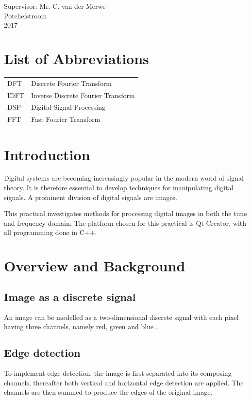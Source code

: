 \documentclass[a4paper,12pt]{article}
\numberwithin{equation}{section} %
\numberwithin{figure}{section}
\begin{document}
\thispagestyle{empty} 	%
Supervisor: Mr. C. van der Merwe\\
Potchefstroom\\
2017

\pagebreak

\tableofcontents 

\listoffigures

\section*{List of Abbreviations}
\begin{center}
\begin{tabular}{l l}
DFT & Discrete Fourier Transform\\
IDFT & Inverse Discrete Fourier Transform\\
DSP & Digital Signal Processing\\
FFT & Fast Fourier Transform\\
\end{tabular}
\end{center}

\newpage
{}

\section{Introduction}
Digital systems are becoming increasingly popular in the modern world of signal theory. It is therefore essential to develop techniques for manipulating digital signals. A prominent division of digital signals are images. 

This practical investigates methods for processing digital images in both the time and frequency domain. The platform chosen for this practical is Qt Creator, with all programming done in C++.

\section{Overview and Background}
\subsection{Image as a discrete signal}
An image can be modelled as a two-dimensional discrete signal with each pixel having three channels, namely red, green and blue \cite{mitra}. 

\subsection{Edge detection}
To implement edge detection, the image is first separated into its composing channels, thereafter both vertical and horizontal edge detection are applied. The channels are then summed to produce the edges of the original image.
\end{document}
